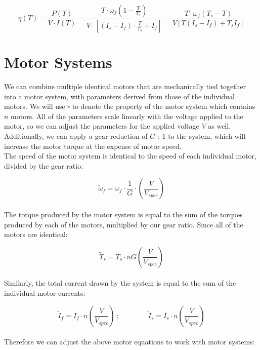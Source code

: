 \documentclass[a4paper]{article}
\begin{document}
	\begin{equation}
		\eta (T) = \frac{P(T)}{V \cdot I (T)}
		= \frac{T \cdot \omega_f \left( 1 - \frac{T}{T_s} \right)}{V \cdot \left[ \left( I_s - I_f \right) \cdot \frac{T}{T_s} + I_f \right]}
		= \frac{T \cdot \omega_f \left( T_s - T \right)}{V \left[ T \left( I_s - I_f \right) + T_s I_f \right]}
	\end{equation}
	
	
	
	\section*{Motor Systems}
	
	We can combine multiple identical motors that are mechanically tied together into a motor system, with parameters derived from those of the individual motors. We will use $ \widetilde{\square} $ to denote the property of the motor system which contains $ n $ motors. All of the parameters scale linearly with the voltage applied to the motor, so we can adjust the parameters for the applied voltage $ V $ as well. Additionally, we can apply a gear reduction of $ G $ : 1 to the system, which will increase the motor torque at the expense of motor speed. \\
	
	The speed of the motor system is identical to the speed of each individual motor, divided by the gear ratio:
	
	\begin{equation}
		\widetilde{\omega}_f = \omega_f \cdot \frac{1}{G} \cdot \left( \frac{V}{V_{spec}} \right)
	\end{equation}
	\\
	The torque produced by the motor system is equal to the sum of the torques produced by each of the motors, multiplied by our gear ratio. Since all of the motors are identical:
	
	\begin{equation}
		\widetilde{T}_s = T_s \cdot n G \left( \frac{V}{V_{spec}} \right)
	\end{equation}
	\\
	Similarly, the total current drawn by the system is equal to the sum of the individual motor currents:
	
	\begin{equation}
		\widetilde{I}_f = I_f \cdot n \left( \frac{V}{V_{spec}} \right)\ ; \qquad\qquad \widetilde{I}_s = I_s \cdot n \left( \frac{V}{V_{spec}} \right)
	\end{equation}
	\\
	Therefore we can adjust the above motor equations to work with motor systems:
	
\end{document}
